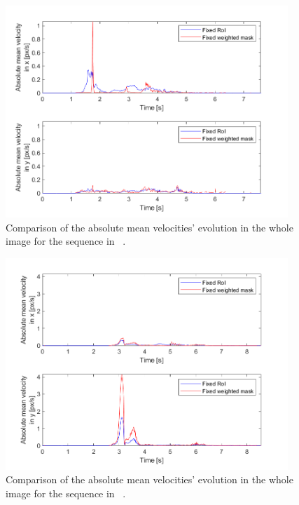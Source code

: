 \begin{figure}[H]
    \centering
    \includegraphics[width=0.95\textwidth]{resources/images/OF_comparison_set_no_slip}
    \caption{Comparison of the absolute mean velocities' evolution in the whole image for the sequence in ~.}\label{fig:OF_comparison_set_no_slip}
\end{figure}

\begin{figure}[H]
    \centering
    \includegraphics[width=0.95\textwidth]{resources/images/OF_comparison_set}
    \caption{Comparison of the absolute mean velocities' evolution in the whole image for the sequence in ~.}\label{fig:OF_comparison_set}
\end{figure}

